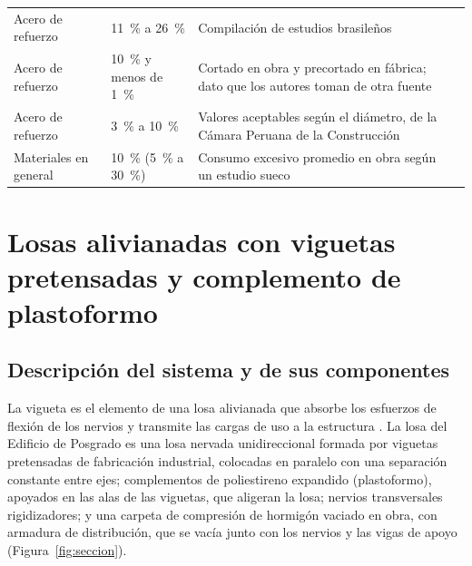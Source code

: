 \begin{longtable}{@{}P{2.5cm}P{2.4cm}P{6.7cm}P{3.6cm}@{}}
Acero de refuerzo & 11~\% a 26~\% & Compilación de estudios brasileños & \textcite[p.~106]{maciel2016} \\
Acero de refuerzo & 10~\% y menos de 1~\% & Cortado en obra y precortado en fábrica; dato que los autores toman de otra fuente & \textcite[p.~583]{abbott2008} \\
Acero de refuerzo & 3~\% a 10~\% & Valores aceptables según el diámetro, de la Cámara Peruana de la Construcción & \textcite[p.~14]{ccoyllo2016} \\
\addlinespace
Materiales en general & 10~\% (5~\% a 30~\%) & Consumo excesivo promedio en obra según un estudio sueco & \textcite[p.~35]{koskela1992} \\
\end{longtable}
\vspace{-6pt}
\endgroup

\section{Losas alivianadas con viguetas pretensadas y complemento de plastoformo}
\label{sec:losas}

\subsection{Descripción del sistema y de sus componentes}

La vigueta es el elemento de una losa alivianada que absorbe los esfuerzos de flexión de los nervios y transmite las cargas de uso a la estructura \parencite[hoja~1]{concretec2018viguetas}. La losa del Edificio de Posgrado es una losa nervada unidireccional formada por viguetas pretensadas de fabricación industrial, colocadas en paralelo con una separación constante entre ejes; complementos de poliestireno expandido (plastoformo), apoyados en las alas de las viguetas, que aligeran la losa; nervios transversales rigidizadores; y una carpeta de compresión de hormigón vaciado en obra, con armadura de distribución, que se vacía junto con los nervios y las vigas de apoyo (Figura~\ref{fig:seccion}).

